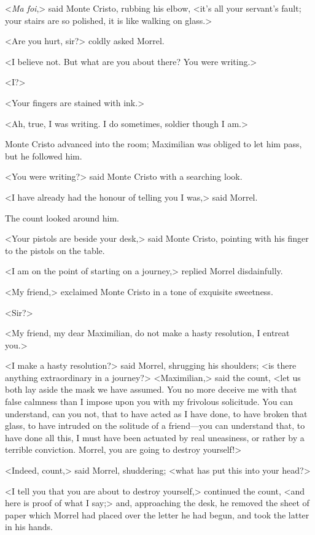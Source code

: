 <\textit{Ma foi},> said Monte Cristo, rubbing his elbow, <it's all your servant's fault; your stairs are so polished, it is like walking on glass.> 

 <Are you hurt, sir?> coldly asked Morrel. 

 <I believe not. But what are you about there? You were writing.> 

 <I?> 

 <Your fingers are stained with ink.> 

 <Ah, true, I was writing. I do sometimes, soldier though I am.> 

 Monte Cristo advanced into the room; Maximilian was obliged to let him pass, but he followed him. 

 <You were writing?> said Monte Cristo with a searching look. 

 <I have already had the honour of telling you I was,> said Morrel. 

 The count looked around him. 

 <Your pistols are beside your desk,> said Monte Cristo, pointing with his finger to the pistols on the table. 

 <I am on the point of starting on a journey,> replied Morrel disdainfully. 

 <My friend,> exclaimed Monte Cristo in a tone of exquisite sweetness. 

 <Sir?> 

 <My friend, my dear Maximilian, do not make a hasty resolution, I entreat you.> 

 <I make a hasty resolution?> said Morrel, shrugging his shoulders; <is there anything extraordinary in a journey?>  <Maximilian,> said the count, <let us both lay aside the mask we have assumed. You no more deceive me with that false calmness than I impose upon you with my frivolous solicitude. You can understand, can you not, that to have acted as I have done, to have broken that glass, to have intruded on the solitude of a friend—you can understand that, to have done all this, I must have been actuated by real uneasiness, or rather by a terrible conviction. Morrel, you are going to destroy yourself!> 

 <Indeed, count,> said Morrel, shuddering; <what has put this into your head?> 

 <I tell you that you are about to destroy yourself,> continued the count, <and here is proof of what I say;> and, approaching the desk, he removed the sheet of paper which Morrel had placed over the letter he had begun, and took the latter in his hands. 

